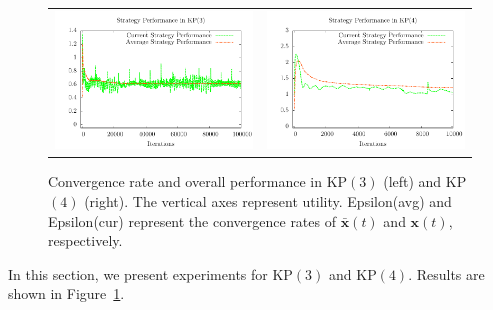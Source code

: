 \documentclass{aamas2014}
\newcommand{\bx}{\mathbf{x}}
\begin{document}
\begin{figure}[t]
\begin{center}
\begin{tabular}{cc}
\hspace{-0.6cm}\includegraphics[scale=0.7]{figs/sfrd3-perf}    & \includegraphics[scale=0.7]{figs/sfrd4-perf} \\
\end{tabular}
\end{center}
\caption{Convergence rate and overall performance in KP$(3)$ (left) and KP$(4)$ (right). 
The vertical axes represent utility. 
Epsilon(avg) and Epsilon(cur) represent the convergence rates
of $\bar{\bx}(t)$ and $\bx(t)$, respectively. \label{fig:sfrd34}}
\end{figure}

In this section, we present experiments for KP$(3)$ and KP$(4)$.  Results 
are shown in Figure~\ref{fig:sfrd34}.

\end{document}
